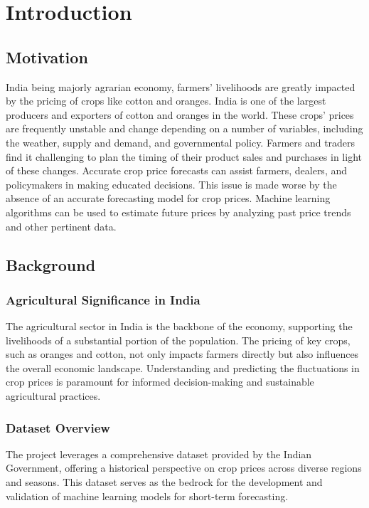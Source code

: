 \section{Introduction}

\subsection{Motivation}
India being majorly agrarian economy, farmers' livelihoods are greatly impacted by the pricing of crops like cotton and oranges. India is one of the largest producers and exporters of cotton and oranges in the world. These crops' prices are frequently unstable and change depending on a number of variables, including the weather, supply and demand, and governmental policy. Farmers and traders find it challenging to plan the timing of their product sales and purchases in light of these changes. Accurate crop price forecasts can assist farmers, dealers, and policymakers in making educated decisions. This issue is made worse by the absence of an accurate forecasting model for crop prices. Machine learning algorithms can be used to estimate future prices by analyzing past price trends and other pertinent data.

\subsection{Background}
\subsubsection{Agricultural Significance in India}
The agricultural sector in India is the backbone of the economy, supporting the livelihoods of a substantial portion of the population. The pricing of key crops, such as oranges and cotton, not only impacts farmers directly but also influences the overall economic landscape. Understanding and predicting the fluctuations in crop prices is paramount for informed decision-making and sustainable agricultural practices.

\subsubsection{Dataset Overview}
The project leverages a comprehensive dataset provided by the Indian Government, offering a historical perspective on crop prices across diverse regions and seasons. This dataset serves as the bedrock for the development and validation of machine learning models for short-term forecasting.

